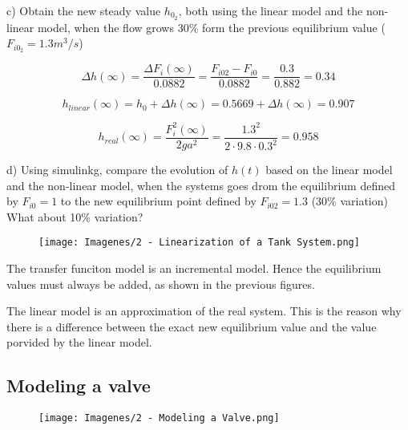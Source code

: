c) Obtain the new steady value $h_{0_2}$, both using the linear model and the non-linear model, when the flow grows 30\% form the previous equilibrium value ($F_{i0_2} = 1.3 m^3/s$)

\[ \Delta h (\infty) = \frac{\Delta F_i (\infty)}{0.0882} = \frac{F_{i02} - F_{i0}}{0.0882} = \frac{0.3}{0.882} = 0.34 \]

\[h_{linear}(\infty) = h_0 + \Delta h(\infty) = 0.5669 + \Delta h(\infty) = 0.907\]

\[h_{real}(\infty) = \frac{F_i^2(\infty)}{2ga^2} = \frac{1.3^2}{2 \cdot 9.8 \cdot 0.3^2} = 0.958\]

d) Using simulinkg, compare the evolution of $h(t)$ based on the linear model and the non-linear model, when the systems goes drom the equilibrium defined by $F_{i0} = 1$ to the new equilibrium point defined by $F_{i02} = 1.3$ (30\% variation) What about 10\% variation?

\begin{figure}[H]
    \centering
    \texttt{[image: Imagenes/2 - Linearization of a Tank System.png]}
    \label{Fig: 2 - Linearization of a Tank System}
\end{figure}

The transfer funciton model is an incremental model. Hence the equilibrium values must always be added, as shown in the previous figures.

The linear model is an approximation of the real system. This is the reason why there is a difference between the exact new equilibrium value and the value porvided by the linear model.

\subsection{Modeling a valve}

\begin{figure}[H]
    \centering
    \texttt{[image: Imagenes/2 - Modeling a Valve.png]}
    \label{Fig: 2 - Modeling a Valve}
\end{figure}

